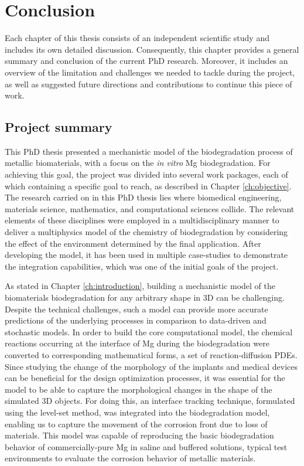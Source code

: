 \chapter{Conclusion}\label{ch:conclusion}


Each chapter of this thesis consists of an independent scientific study and includes its own detailed discussion. Consequently, this chapter provides a general summary and conclusion of the current PhD research. Moreover, it includes an overview of the limitation and challenges we needed to tackle during the project, as well as suggested future directions and contributions to continue this piece of work.

\section{Project summary} \label{sec:conclusion_summary}


This PhD thesis presented a mechanistic model of the biodegradation process of metallic biomaterials, with a focus on the \textit{in vitro} Mg biodegradation. For achieving this goal, the project was divided into several work packages, each of which containing a specific goal to reach, as described in Chapter \ref{ch:objective}. The research carried on in this PhD thesis lies where biomedical engineering, materials science, mathematics, and computational sciences collide. The relevant elements of these disciplines were employed in a multidisciplinary manner to deliver a multiphysics model of the chemistry of biodegradation by considering the effect of the environment determined by the final application. After developing the model, it has been used in multiple case-studies to demonstrate the integration capabilities, which was one of the initial goals of the project.

As stated in Chapter \ref{ch:introduction}, building a mechanistic model of the biomaterials biodegradation for any arbitrary shape in 3D can be challenging. Despite the technical challenges, such a model can provide more accurate predictions of the underlying processes in comparison to data-driven and stochastic models. In order to build the core computational model, the chemical reactions occurring at the interface of Mg during the biodegradation were converted to corresponding mathematical forms, a set of reaction-diffusion PDEs. Since studying the change of the morphology of the implants and medical devices can be beneficial for the design optimization processes, it was essential for the model to be able to capture the morphological changes in the shape of the simulated 3D objects. For doing this, an interface tracking technique, formulated using the level-set method, was integrated into the biodegradation model, enabling us to capture the movement of the corrosion front due to loss of materials. This model was capable of reproducing the basic biodegradation behavior of commercially-pure Mg in saline and buffered solutions, typical test environments to evaluate the corrosion behavior of metallic materials. 

